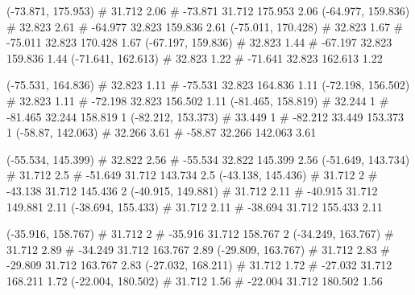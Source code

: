 \documentclass[a4paper,openbib,10pt]{article}
\newenvironment{treegraph}{\begin{graph}}{\end{graph}}
\begin{document}
\begin{treegraph}
  (-73.871, 175.953) #     31.712    2.06
   #    -73.871    31.712    175.953    2.06
  (-64.977, 159.836) #     32.823    2.61
   #    -64.977    32.823    159.836    2.61
  (-75.011, 170.428) #     32.823    1.67
   #    -75.011    32.823    170.428    1.67
  (-67.197, 159.836) #     32.823    1.44
   #    -67.197    32.823    159.836    1.44
  (-71.641, 162.613) #     32.823    1.22
   #    -71.641    32.823    162.613    1.22

  (-75.531, 164.836) #     32.823    1.11
   #    -75.531    32.823    164.836    1.11
  (-72.198, 156.502) #     32.823    1.11
   #    -72.198    32.823    156.502    1.11
  (-81.465, 158.819) #     32.244    1
   #    -81.465    32.244    158.819    1
  (-82.212, 153.373) #     33.449    1
   #    -82.212    33.449    153.373    1
  (-58.87, 142.063) #     32.266    3.61
   #    -58.87    32.266    142.063    3.61

  (-55.534, 145.399) #     32.822    2.56
   #    -55.534    32.822    145.399    2.56
  (-51.649, 143.734) #     31.712    2.5
   #    -51.649    31.712    143.734    2.5
  (-43.138, 145.436) #     31.712    2
   #    -43.138    31.712    145.436    2
  (-40.915, 149.881) #     31.712    2.11
   #    -40.915    31.712    149.881    2.11
  (-38.694, 155.433) #     31.712    2.11
   #    -38.694    31.712    155.433    2.11

  (-35.916, 158.767) #     31.712    2
   #    -35.916    31.712    158.767    2
  (-34.249, 163.767) #     31.712    2.89
   #    -34.249    31.712    163.767    2.89
  (-29.809, 163.767) #     31.712    2.83
   #    -29.809    31.712    163.767    2.83
  (-27.032, 168.211) #     31.712    1.72
   #    -27.032    31.712    168.211    1.72
  (-22.004, 180.502) #     31.712    1.56
   #    -22.004    31.712    180.502    1.56


\end{treegraph}
\end{document}
